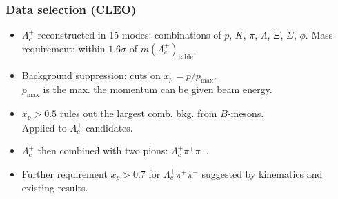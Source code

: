 \documentclass[10pt]{beamer}
\def\Lc{{\Lambda_c^+}}
\def\pip{{\pi^+}}
\def\pim{{\pi^-}}
\begin{document}
\begin{frame}[label=cleo-data]%
  \frametitle{Data selection (CLEO)}
  \large

  \begin{itemize}
    \item $\Lc$ reconstructed in 15 modes: combinations of
      $p$, $K$, $\pi$, $\Lambda$, $\Xi$, $\Sigma$, $\phi$.
      Mass requirement: within $1.6\sigma$ of $m(\Lc)_\text{table}$.
    \item Background suppression: cuts on $x_p = p / p_\mathrm{max}$.
      \\ $p_\mathrm{max}$ is the max. the momentum can be given 
      beam energy.
    \item $x_p > 0.5$ rules out the largest comb. bkg. from $B$-mesons.
      \\ Applied to $\Lc$ candidates.
    \item $\Lc$ then combined with two pions:
      $\Lc\pip\pim$.
    \item Further requirement $x_p > 0.7$ for $\Lc\pip\pim$ suggested by 
      kinematics and existing results.
  \end{itemize}
\end{frame}%
\end{document}
